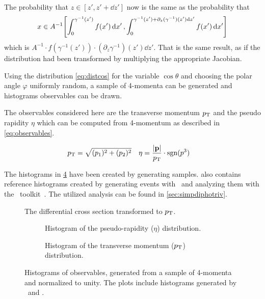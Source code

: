 The probability that \(z\in[z', z'+\dd{z'}]\) now is the same as the
probability that
\[\displaystyle x\in
  A^{-1}\qty[\int_{0}^{\gamma^{-1}(z')}f(x')\dd{x'},
  \int_{0}^{\gamma^{-1}(z')+\partial_z(\gamma^{-1})(z')\dd{z'}}f(x')\dd{x'}]\]
which is
\(A^{-1}\cdot f(\gamma^{-1}(z'))\cdot
(\partial_z\gamma^{-1})(z')\dd{z'}\). That is the same result, as if
the distribution had been transformed by multiplying the appropriate
Jacobian.

Using the distribution \cref{eq:distcos} for the variable
\(\cos\theta\) and choosing the polar angle \(\varphi\) uniformly
random, a sample of 4-momenta can be generated and histograms
observables can be drawn.

The observables considered here are the transverse momentum \(p_\mathrm{T}\)
and the pseudo rapidity \(\eta\) which can be computed from 4-momentum
as described in \cref{eq:observables}.

\begin{align}
  \label{eq:observables}
  p_\mathrm{T} &= \sqrt{(p_1)^2+(p_2)^2} & \eta &=
                                         \frac{\abs{\vb{p}}}{p_\mathrm{T}}\cdot\operatorname{sgn}(p^3)
\end{align}

The histograms in \cref{fig:histos} have been created by generating
 samples.  also
contains reference histograms created by generating events with
\sherpa\ and analyzing them with the \rivet\
toolkit~\cite{Bierlich:2019rhm}. The utilized analysis can be found
in \cref{sec:simpdiphotriv}.

\begin{figure}[hb]
  \centering {}
  \caption{\label{fig:diff-xs-pt} The differential cross section
    transformed to \(p_\mathrm{T}\).}
\end{figure}

\begin{figure}[p]
  \centering

  \begin{subfigure}[b]{\textwidth}
    \centering {}
    \caption{\label{fig:histeta} Histogram of the pseudo-rapidity
      (\(\eta\)) distribution.}
  \end{subfigure}
  \begin{subfigure}[b]{\textwidth}
    \centering {}
    \caption{\label{fig:histpt} Histogram of the transverse momentum
      (\(p_\mathrm{T}\)) distribution.}
  \end{subfigure}
  \caption{\label{fig:histos} Histograms of observables, generated
    from a sample of 4-momenta and normalized to unity. The plots
    include histograms generated by \sherpa\ and \rivet.}
\end{figure}

